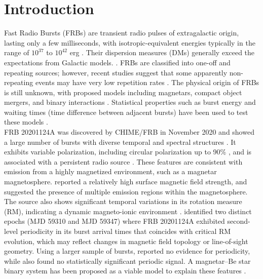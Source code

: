 \documentclass[preprint2, trackchanges]{aastex631}
\begin{document}
\section{Introduction} 
Fast Radio Bursts (FRBs) are transient radio pulses of extragalactic origin, lasting only a few milliseconds, with isotropic-equivalent energies typically in the range of  $10^{37}$ to $10^{42}$ erg \citep{Petroff_2019, Zhang2020}. Their dispersion measures (DMs) generally exceed the expectations from Galactic models. \citep{Lorimer2007, Petroff_2019, Xiao, cordes}. FRBs are classified into one-off and repeating sources; however, recent studies suggest that some apparently non-repeating events may have very low repetition rates \citep{yamasaki2023true, Kirsten2024, 2026MNRAS.545f1937O}. The physical origin of FRBs is still unknown, with proposed models including magnetars, compact object mergers, and binary interactions \citep{Platts2019, Zhang2020, Nimmo2022,Bochenek2020, 2010vaoa.conf..129P}. Statistical properties such as burst energy and waiting times (time difference between adjacent bursts) have been used to test these models \citep{Zhang_2021, Oppermann2018, cruces2020}.
\\
FRB 20201124A was discovered by CHIME/FRB in November 2020 and showed a large number of bursts with diverse temporal and spectral structures \citep{Lanman_2022, Xu2022}. It exhibits variable polarization, including circular polarization up to 90\% \citep{Niu_2024, Jiang2024,  Hilmarsson_2021}, and is associated with a persistent radio source \citep{PRS}. These features are consistent with emission from a highly magnetized environment, such as a magnetar magnetosphere. \citet{chen_du2024} reported a relatively high surface magnetic field strength, and suggested the presence of multiple emission regions within the magnetosphere. The source also shows significant temporal variations in its rotation measure (RM), indicating a dynamic magneto-ionic environment \citep{Xu2022}. \citet{2025arXiv250517880Z} identified two distinct epochs (MJD
59310 and MJD 59347) where FRB 20201124A exhibited second-level periodicity in its burst arrival times that coincides with critical RM evolution, which may reflect changes in magnetic field topology or line-of-sight geometry. Using a larger sample of bursts, \citet{Niu2022} reported no evidence for periodicity, while \citet{2025arXiv250514219G} also found no statistically significant periodic signal. A magnetar–Be star binary system has been proposed as a viable model to explain these features \citep{Wang2022}.
\\
\end{document}
